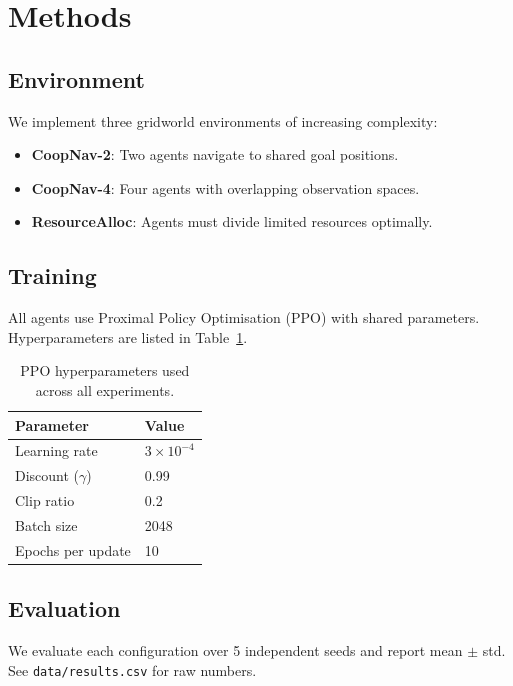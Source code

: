 \section{Methods}
\label{sec:methods}

\subsection{Environment}

We implement three gridworld environments of increasing complexity:
\begin{itemize}
  \item \textbf{CoopNav-2}: Two agents navigate to shared goal positions.
  \item \textbf{CoopNav-4}: Four agents with overlapping observation spaces.
  \item \textbf{ResourceAlloc}: Agents must divide limited resources optimally.
\end{itemize}

\subsection{Training}

All agents use Proximal Policy Optimisation (PPO) with shared parameters.
Hyperparameters are listed in Table~\ref{tab:hyperparams}.

\begin{table}[h]
\centering
\begin{tabular}{ll}
\hline
\textbf{Parameter} & \textbf{Value} \\
\hline
Learning rate      & $3 \times 10^{-4}$ \\
Discount ($\gamma$)& 0.99 \\
Clip ratio         & 0.2 \\
Batch size         & 2048 \\
Epochs per update  & 10 \\
\hline
\end{tabular}
\caption{PPO hyperparameters used across all experiments.}
\label{tab:hyperparams}
\end{table}

\subsection{Evaluation}

We evaluate each configuration over 5 independent seeds and report mean $\pm$ std.
See \texttt{data/results.csv} for raw numbers.
